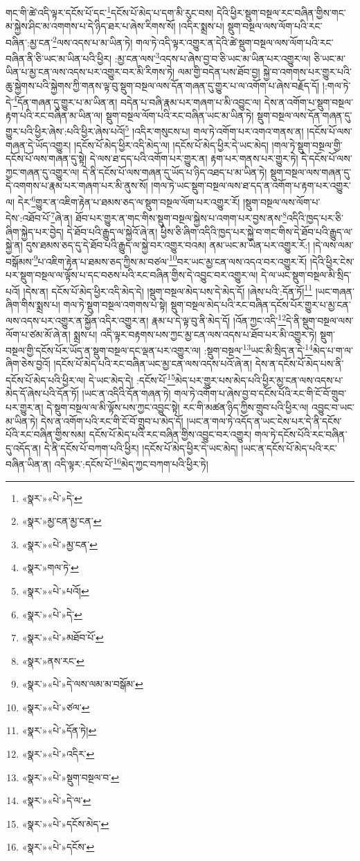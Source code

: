 གང་གི་ཚེ་འདི་ལྟར་དངོས་པོ་དང་\footnote{«སྣར་»«པེ་»དེ་}དངོས་པོ་མེད་པ་དག་མི་རུང་བས། དེའི་ཕྱིར་སྡུག་བསྔལ་རང་བཞིན་གྱིས་གང་མ་སྐྱེས་ཤིང་མ་འགགས་པ་དེ་ཉིད་ཐར་པ་ཞེས་རིགས་སོ། །འདིར་སྨྲས་པ། སྡུག་བསྔལ་ལས་ལོག་པའི་རང་བཞིན་:མྱ་ངན་\footnote{«སྣར་»མྱ་ངན་མྱ་ངན་}ལས་འདས་པ་མ་ཡིན་ཏེ། གལ་ཏེ་འདི་ལྟར་འགྱུར་ན་དེའི་ཚེ་སྡུག་བསྔལ་ལས་ལོག་པའི་རང་བཞིན་ནི་ཅི་ཡང་མ་ཡིན་པའི་ཕྱིར། :མྱ་ངན་ལས་\footnote{«སྣར་»«པེ་»མྱ་ངན་}འདས་པ་ཞེས་བྱ་བ་ཅི་ཡང་མ་ཡིན་པར་འགྱུར་ལ། ཅི་ཡང་མ་ཡིན་པ་མྱ་ངན་ལས་འདས་པར་འགྱུར་བར་མི་རིགས་ཏེ། ལམ་གྱི་བདེན་པས་ཐོབ་བྱ། སྐྱེ་བ་འགགས་པར་གྱུར་པའི་ཆུ་སྐྱེགས་པའི་སྐྱེགས་ཀྱི་གནས་ལྟ་བུ་སྡུག་བསྔལ་ལས་དོན་གཞན་དུ་གྱུར་པ་ལ་འགོག་པ་ཞེས་བརྗོད་དོ། །:གལ་ཏེ་དེ་\footnote{«སྣར་»གལ་ཏེ་}དོན་གཞན་དུ་གྱུར་པ་མ་ཡིན་ན། བདེན་པ་བཞི་རྣམ་པར་གཞག་པ་མི་འབྱུང་ལ། དེས་ན་འགོག་པ་སྡུག་བསྔལ་རྟག་པའི་རང་བཞིན་མ་ཡིན་ལ། སྡུག་བསྔལ་ལོག་པའི་རང་བཞིན་ཡང་མ་ཡིན་ཏེ། སྡུག་བསྔལ་ལས་དོན་གཞན་དུ་གྱུར་པའི་ཕྱིར་ཞེས་:པའི་ཕྱིར་ཞེས་པའོ།\footnote{«སྣར་»«པེ་»པའོ།} །འདིར་གསུངས་པ། གལ་ཏེ་འགོག་པར་འགའ་གནས་ན། །དངོས་པོ་ལས་གཞན་དེ་ཡོད་འགྱུར། །དངོས་པོ་མེད་ཕྱིར་འདི་མེད་ལ། །དངོས་པོ་མེད་ཕྱིར་དེ་ཡང་མེད། །གལ་ཏེ་སྡུག་བསྔལ་གྱི་དངོས་པོ་ལས་གཞན་དུ་སྟེ། དེ་ལས་ཐ་དད་པའི་འགོག་པར་གྱུར་ན། རྟག་པར་གནས་པར་གྱུར་ཏེ། དེ་དངོས་པོ་ལས་ཀྱང་གཞན་དུ་འགྱུར་ལ། དེ་ནི་དངོས་པོ་ལས་གཞན་དུ་ཡོད་པ་ཉིད་འཐད་པ་མ་ཡིན་ཏེ། སྡུག་བསྔལ་ལས་གཞན་དུ་དེ་འགགས་པ་རྣམ་པར་གཞག་པར་མི་ནུས་སོ། །གལ་ཏེ་ཡང་སྡུག་བསྔལ་ལས་ཐ་དད་ན་འགོག་པ་རྟག་པར་འགྱུར་ལ། དེར་\footnote{«སྣར་»«པེ་»དེ་}གྱུར་ན་འཇིག་རྟེན་པ་ཐམས་ཅད་ལ་སྡུག་བསྔལ་ལོག་པར་འགྱུར་རོ། །སྡུག་བསྔལ་ལས་ལོག་པ་དེས་:འཐོབ་པོ་\footnote{«སྣར་»«པེ་»མཐོབ་པོ་}ཞེ་ན། ཐོབ་པར་གྱུར་ན་གང་གིས་སྡུག་བསྔལ་སྐྱེས་པ་འགག་པར་བྱས་ནས་\footnote{«སྣར་»ནས་རང་}འདིའི་ཁྱད་པར་ཅི་ཞིག་སྐྱེད་པར་བྱེད། དེ་ཐོབ་པའི་རྒྱུད་ལ་སྐྱེའོ་ཞེ་ན། ཕྱིས་ཅི་ཞིག་འདིའི་ཁྱད་པར་སྐྱེ་བ་གང་གིས་དེ་ཐོབ་པའི་རྒྱུད་ལ་སྐྱེ་ན། དུས་ཐམས་ཅད་དུ་དེ་ཐོབ་པའི་རྒྱུད་ལ་སྐྱེ་བར་འགྱུར་བའམ། ནམ་ཡང་མ་ཡིན་པར་འགྱུར་རོ:། །དེ་ལས་ལམ་བསྒོམས་\footnote{«སྣར་»«པེ་»དེ་ལས་ལམ་མ་བསྒོམ་}པ་འཇིག་རྟེན་པ་ཐམས་ཅད་ཀྱིས་མ་བཙལ་\footnote{«སྣར་»«པེ་»ཙལ་}བར་ཡང་མྱ་ངན་ལས་འདའ་བར་འགྱུར་རོ། །དེའི་ཕྱིར་ངེས་པར་སྡུག་བསྔལ་ལ་ལྟོས་པ་དང་བཅས་པའི་རང་བཞིན་གྱིས་དེ་འབྱུང་བར་འགྱུར་ལ། དེ་ལ་ཡང་སྡུག་བསྔལ་མི་སྲིད་པའོ། །དེས་ན། དངོས་པོ་མེད་ཕྱིར་འདི་མེད་དེ། །སྡུག་བསྔལ་མེད་པས་དེ་མེད་དོ། །ཞེས་པའི་:དོན་ཏོ།\footnote{«སྣར་»«པེ་»དོན་ཏེ།} །ཡང་གཞན་ཞིག་གིས་སྨྲས་པ། གལ་ཏེ་སྡུག་བསྔལ་འགགས་པ་སྟེ། སྡུག་བསྔལ་མེད་པའི་རང་བཞིན་དངོས་པོར་གྱུར་པ་མྱ་ངན་ལས་འདས་པར་འགྱུར་ན་སྐྱོན་འདིར་འགྱུར་ན། རྣམ་པ་དེ་ལྟ་བུ་ནི་མེད་དོ། །འོན་ཀྱང་འདི་\footnote{«སྣར་»«པེ་»འདིར་}དེ་ནི་སྡུག་བསྔལ་ལས་ལོག་པ་ཙམ་མོ་ཞེ་ན། སྨྲས་པ། འདི་ལྟར་བརྟགས་པས་ཀྱང་མྱ་ངན་ལས་འདས་པ་ཐོབ་པར་མི་འགྱུར་ཏེ། སྡུག་བསྔལ་གྱི་དངོས་པོར་ཡོད་ན་སྡུག་བསྔལ་དང་ལྡན་པར་འགྱུར་ལ། :སྡུག་བསྔལ་\footnote{«སྣར་»«པེ་»སྡུག་བསྔལ་བ་}ཡང་མི་སྲིད་ན་དེ་\footnote{«སྣར་»«པེ་»དེ་ལ་}མེད་པ་ག་ལ་ཞིག་ཅེས་བྱའོ། །དངོས་པོ་མེད་པའི་རང་བཞིན་ཡང་མྱ་ངན་ལས་འདས་པའོ་ཞེ་ན། དེས་ན་དངོས་པོ་མེད་པས་ནི་དངོས་པོ་མེད་པའི་ཕྱིར་ལ། དེ་ཡང་མེད་དེ། :དངོས་པོ་\footnote{«སྣར་»«པེ་»དངོས་མེད་}མེད་པར་གྱུར་པས་མེད་པའི་ཕྱིར་མྱ་ངན་ལས་འདས་པ་མེད་དོ་ཞེས་པའི་དོན་ཏོ། །ཡང་ན་འདིའི་དོན་གཞན་ཏེ། གལ་ཏེ་འགོག་པ་ཞེས་བྱ་བ་དངོས་པོའི་རང་གི་ངོ་བོ་གྲུབ་པར་གྱུར་ན། དེ་སྡུག་བསྔལ་ལ་མི་ལྟོས་པས་ཀྱང་འབྱུང་སྟེ། རང་གི་མཚན་ཉིད་ཀྱིས་གྲུབ་པའི་ཕྱིར་ལ། འབྱུང་བ་ཡང་མ་ཡིན་ཏེ། དེས་ན་འགོག་པའི་རང་གི་ངོ་བོ་གྲུབ་པ་མེད་དོ། །ཡང་ན་གལ་ཏེ་འདོད་ན་ཡང་ངེས་པར་དེ་ནི་དངོས་པོའི་རང་བཞིན་གྱིས་སམ། དངོས་པོ་མེད་པའི་རང་བཞིན་གྱིས་འབྱུང་བར་འགྱུར། གལ་ཏེ་དངོས་པོའི་རང་བཞིན་དུ་འདོད་ན། དེ་ནི་དངོས་པོ་བཀག་པའི་ཕྱིར། །དངོས་པོ་མེད་ཕྱིར་དེ་ཡང་མེད། །ཡང་ན་དངོས་པོ་མེད་པའི་རང་བཞིན་ཡིན་ན། འདི་ལྟར་:དངོས་པོ་\footnote{«སྣར་»«པེ་»དངོས་}མེད་ཀྱང་བཀག་པའི་ཕྱིར་ཏེ། 